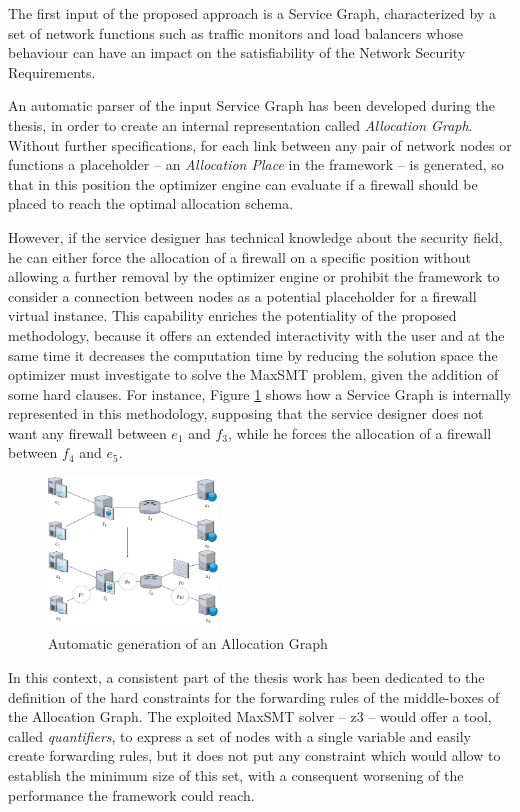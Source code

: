 \documentclass[10pt,a4paper,roman, twocolumn]{article}
\begin{document}
The first input of the proposed approach is a Service Graph, characterized by a set of network functions such as traffic monitors and load balancers whose behaviour can have an impact on the satisfiability of the Network Security Requirements.

An automatic parser of the input Service Graph has been developed during the thesis, in order to create an internal representation called \textit{Allocation Graph}. Without further specifications, for each link between any pair of network nodes or functions a placeholder -- an \textit{Allocation Place} in the framework -- is generated, so that in this position the optimizer engine can evaluate if a firewall should be placed to reach the optimal allocation schema. 

However, if the service designer has technical knowledge about the security field, he can either force the allocation of a firewall on a specific position without allowing a further removal by the optimizer engine or prohibit the framework to consider a connection between nodes as a potential placeholder for a firewall virtual instance. This capability enriches the potentiality of the proposed methodology, because it offers an extended interactivity with the user and at the same time it decreases the computation time by reducing the solution space the optimizer must investigate to solve the MaxSMT problem, given the addition of some hard clauses. For instance, Figure \ref{fig:stoa} shows how a Service Graph is internally represented in this methodology, supposing that the service designer does not want any firewall between $e_{1}$ and $f_{3}$, while he forces the allocation of a firewall between $f_{4}$ and $e_{5}$.
\begin{figure} [tbh]
	\centerline{\includegraphics[width=0.4\textwidth]{images/stoa.png}}
	\caption{Automatic generation of an Allocation Graph}
	\label{fig:stoa}
\end{figure}

In this context, a consistent part of the thesis work has been dedicated to the definition of the hard constraints for the forwarding rules of the middle-boxes of the Allocation Graph. The exploited MaxSMT solver -- z3 -- would offer a tool, called \textit{quantifiers}, to express a set of nodes with a single variable and easily create forwarding rules, but it does not put any constraint which would allow to establish the minimum size of this set, with a consequent worsening of the performance the framework could reach. 
\end{document}
